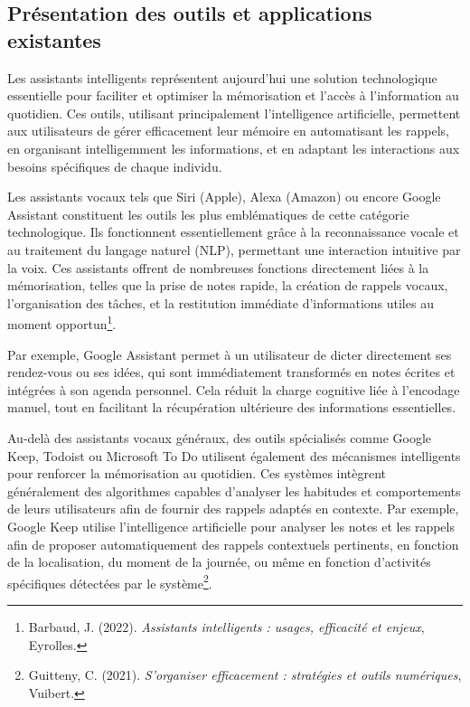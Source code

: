\documentclass[12pt,a4paper]{report}
\begin{document}
\subsection{Présentation des outils et applications existantes}

Les assistants intelligents représentent aujourd’hui une solution technologique essentielle pour faciliter et optimiser la mémorisation et l'accès à l’information au quotidien. Ces outils, utilisant principalement l’intelligence artificielle, permettent aux utilisateurs de gérer efficacement leur mémoire en automatisant les rappels, en organisant intelligemment les informations, et en adaptant les interactions aux besoins spécifiques de chaque individu.

Les assistants vocaux tels que Siri (Apple), Alexa (Amazon) ou encore Google Assistant constituent les outils les plus emblématiques de cette catégorie technologique. Ils fonctionnent essentiellement grâce à la reconnaissance vocale et au traitement du langage naturel (NLP), permettant une interaction intuitive par la voix. Ces assistants offrent de nombreuses fonctions directement liées à la mémorisation, telles que la prise de notes rapide, la création de rappels vocaux, l’organisation des tâches, et la restitution immédiate d'informations utiles au moment opportun\footnote{Barbaud, J. (2022). \textit{Assistants intelligents : usages, efficacité et enjeux}, Eyrolles.}.

Par exemple, Google Assistant permet à un utilisateur de dicter directement ses rendez-vous ou ses idées, qui sont immédiatement transformés en notes écrites et intégrées à son agenda personnel. Cela réduit la charge cognitive liée à l’encodage manuel, tout en facilitant la récupération ultérieure des informations essentielles.

Au-delà des assistants vocaux généraux, des outils spécialisés comme Google Keep, Todoist ou Microsoft To Do utilisent également des mécanismes intelligents pour renforcer la mémorisation au quotidien. Ces systèmes intègrent généralement des algorithmes capables d’analyser les habitudes et comportements de leurs utilisateurs afin de fournir des rappels adaptés en contexte. Par exemple, Google Keep utilise l’intelligence artificielle pour analyser les notes et les rappels afin de proposer automatiquement des rappels contextuels pertinents, en fonction de la localisation, du moment de la journée, ou même en fonction d'activités spécifiques détectées par le système\footnote{Guitteny, C. (2021). \textit{S'organiser efficacement : stratégies et outils numériques}, Vuibert.}.
\end{document}
